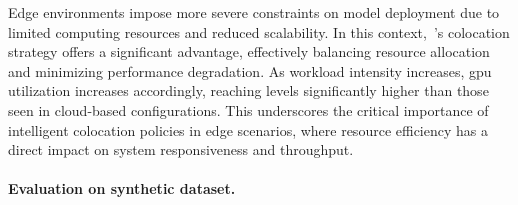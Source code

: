 Edge environments impose more severe constraints on model deployment due to limited computing resources and reduced scalability. In this context,~\roomie's colocation strategy offers a significant advantage, effectively balancing resource allocation and minimizing performance degradation. As workload intensity increases, \acrshort{gpu} utilization increases accordingly, reaching levels significantly higher than those seen in cloud-based configurations. This underscores the critical importance of intelligent colocation policies in edge scenarios, where resource efficiency has a direct impact on system responsiveness and throughput.

\paragraph{Evaluation on synthetic dataset.}

